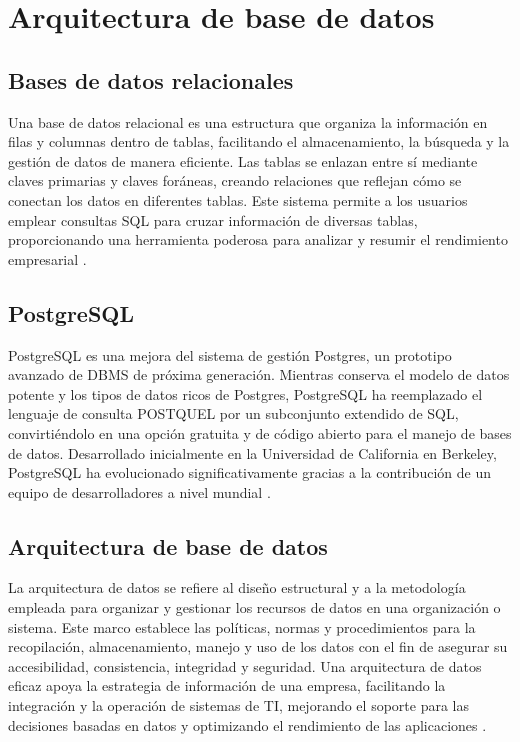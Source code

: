 \section{Arquitectura de base de datos}
\subsection{Bases de datos relacionales}
Una base de datos relacional es una estructura que organiza la información en filas y columnas dentro de tablas, facilitando el almacenamiento, la búsqueda y la gestión de datos de manera eficiente. Las tablas se enlazan entre sí mediante claves primarias y claves foráneas, creando relaciones que reflejan cómo se conectan los datos en diferentes tablas. Este sistema permite a los usuarios emplear consultas SQL para cruzar información de diversas tablas, proporcionando una herramienta poderosa para analizar y resumir el rendimiento empresarial \cite{Relacionales}.

\subsection{PostgreSQL}
PostgreSQL es una mejora del sistema de gestión Postgres, un prototipo avanzado de DBMS de próxima generación. Mientras conserva el modelo de datos potente y los tipos de datos ricos de Postgres, PostgreSQL ha reemplazado el lenguaje de consulta POSTQUEL por un subconjunto extendido de SQL, convirtiéndolo en una opción gratuita y de código abierto para el manejo de bases de datos. Desarrollado inicialmente en la Universidad de California en Berkeley, PostgreSQL ha evolucionado significativamente gracias a la contribución de un equipo de desarrolladores a nivel mundial \cite{Postgres}.

\subsection{Arquitectura de base de datos}
La arquitectura de datos se refiere al diseño estructural y a la metodología empleada para organizar y gestionar los recursos de datos en una organización o sistema. Este marco establece las políticas, normas y procedimientos para la recopilación, almacenamiento, manejo y uso de los datos con el fin de asegurar su accesibilidad, consistencia, integridad y seguridad. Una arquitectura de datos eficaz apoya la estrategia de información de una empresa, facilitando la integración y la operación de sistemas de TI, mejorando el soporte para las decisiones basadas en datos y optimizando el rendimiento de las aplicaciones \cite{ArquitecturaDatos}.

